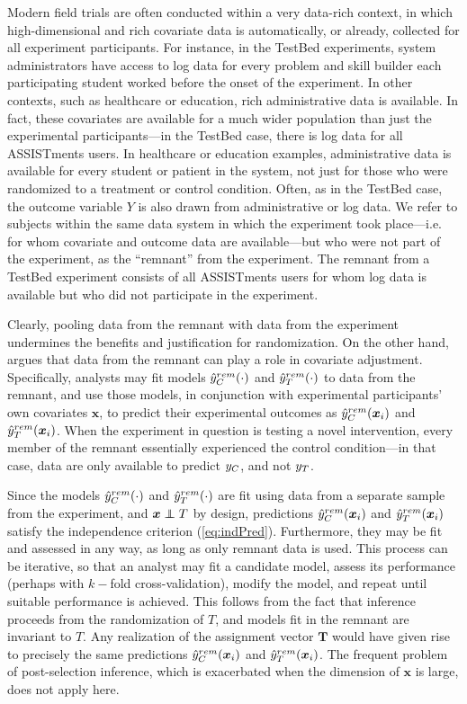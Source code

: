 Modern field trials are often conducted within a very data-rich
context, in which high-dimensional and rich covariate data is
automatically, or already, collected for all experiment participants.
For instance, in the TestBed experiments, system administrators have
access to log data for every problem and skill builder each
participating student worked before the onset of the experiment.
In other contexts, such as healthcare or education, rich
administrative data is available.
In fact, these covariates are available for a much wider population
than just the experimental participants---in the TestBed case, there
is log data for all ASSISTments users.
In healthcare or education examples, administrative data is available
for every student or patient in the system, not just for those who
were randomized to a treatment or control condition.
Often, as in the TestBed case, the outcome variable $Y$ is also drawn from administrative or
log data.
We refer to subjects within the same data system in which the
experiment took place---i.e. for whom covariate and outcome data are
available---but who were not part of the experiment, as the ``remnant'' from the experiment.
The remnant from a TestBed experiment consists of all ASSISTments
users for whom log data is available but who did not participate in
the experiment.

Clearly, pooling data from the remnant with data from the experiment
undermines the benefits and justification for randomization.
On the other hand, \citet{rebarEDM} argues that data from the remnant
can play a role in covariate adjustment.
Specifically, analysts may fit models $\hat{y}_C^{rem}(\cdot)$ and $\hat{y}_T^{rem}(\cdot)$ to data
from the remnant, and use those models, in conjunction with
experimental participants' own covariates $\bm{x}$, to predict their
experimental outcomes as $\hat{y}_C^{rem}(\bm{x}_i)$ and $\hat{y}_T^{rem}(\bm{x}_i)$.%
When the experiment in question is testing a novel intervention, every
member of the remnant essentially experienced the control
condition---in that case, data are only available to predict $y_C$,
and not $y_T$.

Since the models $\hat{y}_C^{rem}(\cdot) $ and $\hat{y}_T^{rem}(\cdot) $ are fit using data from a
separate sample from the experiment, and $\bm{x}\independent T$ by
design, predictions $\hat{y}_C^{rem}(\bm{x}_i) $ and $\hat{y}_T^{rem}(\bm{x}_i) $ satisfy the
independence criterion (\ref{eq:indPred}).
Furthermore, they may be fit and assessed in any way, as
long as only remnant data is used.
This process can be iterative, so that an analyst may fit a candidate
model, assess its performance (perhaps with $k-$fold
cross-validation), modify the model, and repeat until suitable
performance is achieved.
This follows from the fact that inference proceeds from the
randomization of $T$, and models fit in the remnant are invariant to
$T$.
Any realization of the assignment vector $\bm{T}$ would have given
rise to precisely the same predictions $\hat{y}_C^{rem}(\bm{x}_i) $ and $\hat{y}_T^{rem}(\bm{x}_i) $.
The frequent problem of post-selection inference, which is exacerbated
when the dimension of $\bm{x}$ is large, does not apply here.

